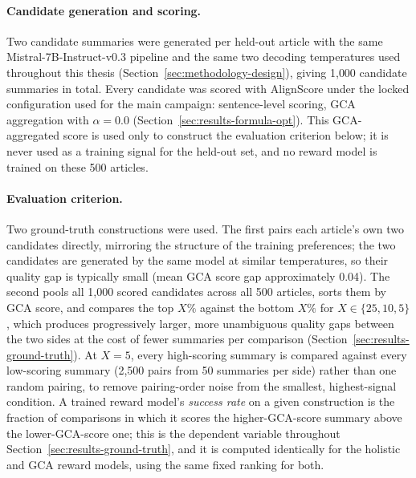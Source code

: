\paragraph{Candidate generation and scoring.} Two candidate summaries were
generated per held-out article with the same Mistral-7B-Instruct-v0.3 pipeline
and the same two decoding temperatures used throughout this thesis
(Section~\ref{sec:methodology-design}), giving 1{,}000 candidate summaries in
total. Every candidate was scored with AlignScore under the locked
configuration used for the main campaign: sentence-level scoring, GCA
aggregation with $\alpha=0.0$ (Section~\ref{sec:results-formula-opt}). This
GCA-aggregated score is used only to construct the evaluation criterion
below; it is never used as a training signal for the held-out set, and no
reward model is trained on these 500 articles.

\paragraph{Evaluation criterion.} Two ground-truth constructions were used.
The first pairs each article's own two candidates directly, mirroring the
structure of the training preferences; the two candidates are generated by
the same model at similar temperatures, so their quality gap is typically
small (mean GCA score gap approximately 0.04). The second pools all
1{,}000 scored candidates across all 500 articles, sorts them by GCA score,
and compares the top $X\%$ against the bottom $X\%$ for $X\in\{25,10,5\}$,
which produces progressively larger, more unambiguous quality gaps between
the two sides at the cost of fewer summaries per comparison
(Section~\ref{sec:results-ground-truth}). At $X=5$, every high-scoring
summary is compared against every low-scoring summary (2{,}500 pairs from 50
summaries per side) rather than one random pairing, to remove pairing-order
noise from the smallest, highest-signal condition. A trained reward model's
\emph{success rate} on a given construction is the fraction of comparisons in
which it scores the higher-GCA-score summary above the lower-GCA-score one;
this is the dependent variable throughout Section~\ref{sec:results-ground-truth},
and it is computed identically for the holistic and GCA reward models,
using the same fixed ranking for both.

